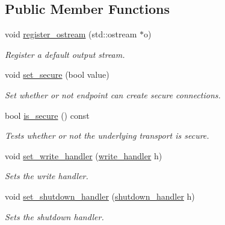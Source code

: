 \subsection*{Public Member Functions}
\begin{DoxyCompactItemize}
\item 
void \hyperlink{classwebsocketpp_1_1transport_1_1iostream_1_1endpoint_ad6db3b10406e568befba8e00ae8b6ac4}{register\+\_\+ostream} (std\+::ostream $\ast$o)
\begin{DoxyCompactList}\small\item\em Register a default output stream. \end{DoxyCompactList}\item 
void \hyperlink{classwebsocketpp_1_1transport_1_1iostream_1_1endpoint_ae6488ca0ead1ce09a60e16a896162ad5}{set\+\_\+secure} (bool value)
\begin{DoxyCompactList}\small\item\em Set whether or not endpoint can create secure connections. \end{DoxyCompactList}\item 
bool \hyperlink{classwebsocketpp_1_1transport_1_1iostream_1_1endpoint_a42cfc1af42cd261b471bab53b85a2e2f}{is\+\_\+secure} () const
\begin{DoxyCompactList}\small\item\em Tests whether or not the underlying transport is secure. \end{DoxyCompactList}\item 
void \hyperlink{classwebsocketpp_1_1transport_1_1iostream_1_1endpoint_a1db266dab8c73f4aa2e8a3bdb95ec5a3}{set\+\_\+write\+\_\+handler} (\hyperlink{namespacewebsocketpp_1_1transport_1_1iostream_abc22b834c2d0c698d6c87e51d5bfad2c}{write\+\_\+handler} h)
\begin{DoxyCompactList}\small\item\em Sets the write handler. \end{DoxyCompactList}\item 
void \hyperlink{classwebsocketpp_1_1transport_1_1iostream_1_1endpoint_a2ba3290fe7688190c2e85143f52d88cc}{set\+\_\+shutdown\+\_\+handler} (\hyperlink{namespacewebsocketpp_1_1transport_1_1iostream_a3563ce2cca06b1466f7d76ecb8eb4a0b}{shutdown\+\_\+handler} h)
\begin{DoxyCompactList}\small\item\em Sets the shutdown handler. \end{DoxyCompactList}\end{DoxyCompactItemize}
